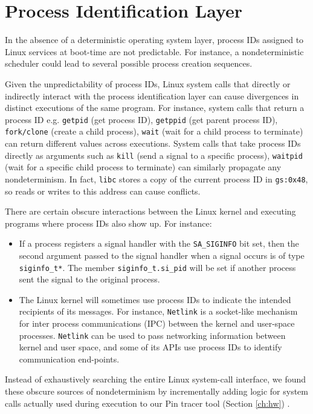 \section{Process Identification Layer} \label{ch3:pid}

In the absence of a deterministic operating system layer, process IDs assigned
to Linux services at boot-time are not predictable.
For instance, a nondeterministic scheduler 
could lead to several possible process creation sequences.

Given the unpredictability of process IDs,
Linux system calls that directly or indirectly
interact with the process identification layer can cause divergences
in distinct executions of the same program.
For instance, system calls that return a process ID e.g.
\texttt{getpid} (get process ID), \texttt{getppid} (get
parent process ID), \texttt{fork/clone} (create a child process),
\texttt{wait} (wait for a child process to terminate)
can return different values across executions. System calls that take process IDs 
directly as arguments such as \texttt{kill} (send a signal to a specific
process), \texttt{waitpid} (wait for a specific child process to terminate)
can similarly propagate any nondeterminism.
In fact, \texttt{libc} stores a copy of the current process ID in \texttt{gs:0x48},
so reads or writes to this address can cause conflicts.

There are certain obscure interactions
between the Linux kernel and executing programs
where process IDs also show up. For instance:
\begin{itemize} 
\item If a process registers a signal handler with the \texttt{SA\_SIGINFO}
bit set, then the second argument passed
to the signal handler when a signal occurs is of type \texttt{siginfo\_t*}.
The member \texttt{siginfo\_t.si\_pid} will
be set if another process sent the signal 
to the original process. 
\item The Linux kernel will sometimes use process IDs 
to indicate the intended recipients of its messages. 
For instance, \texttt{Netlink} is a socket-like
mechanism for inter process communications (IPC)
between the kernel and user-space processes.
\texttt{Netlink} can be used to pass
networking information between kernel
and user space, and some of its APIs 
use process IDs to identify communication
end-points. \end{itemize}

Instead of exhaustively searching the entire
Linux system-call interface, we found these obscure sources of
nondeterminism by incrementally adding logic 
for system calls actually used during execution
to our Pin tracer tool (Section \ref{ch:hw}) .

